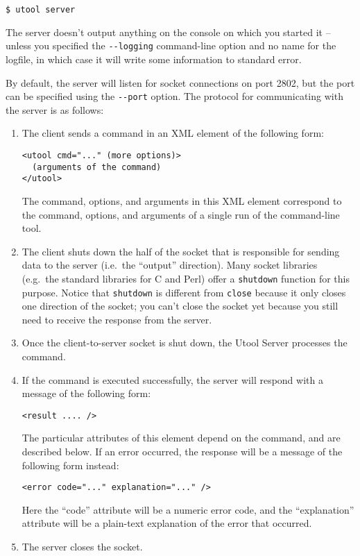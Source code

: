 \begin{verbatim}
$ utool server
\end{verbatim}

The server doesn't output anything on the console on which you started
it -- unless you specified the \verb?--logging? command-line option
and no name for the logfile, in which case it will write some
information to standard error. 

By default, the server will listen for socket connections on port
2802, but the port can be specified using the \verb?--port?
option. The protocol for communicating with the server is as follows:


\begin{enumerate}
\item The client sends a command in an XML element of the following
form: 
\begin{verbatim}
<utool cmd="..." (more options)>
  (arguments of the command)
</utool>
\end{verbatim}

The command, options, and arguments in this XML element correspond to
the command, options, and arguments of a single run of the
command-line tool.

\item The client shuts down the half of the socket that is responsible
for sending data to the server (i.e.\ the ``output'' direction). Many
socket libraries (e.g.\ the standard libraries for C and Perl) offer a
\verb?shutdown? function for this purpose. Notice that \verb?shutdown?
is different from \verb?close? because it only closes one direction of
the socket; you can't close the socket yet because you still need to
receive the response from the server.

\item Once the client-to-server socket is shut down, the Utool Server
processes the command.

\item If the command is executed successfully, the server will respond
with a message of the following form:

\begin{verbatim}
<result .... />
\end{verbatim}

The particular attributes of this element depend on the command, and
are described below. If an error occurred, the response will be a
message of the following form instead:

\begin{verbatim}
<error code="..." explanation="..." />
\end{verbatim}

Here the ``code'' attribute will be a numeric error code, and the
``explanation'' attribute will be a plain-text explanation of the
error that occurred.

\item The server closes the socket.
\end{enumerate}


